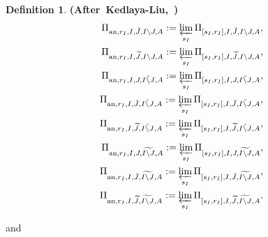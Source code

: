 \documentclass[12pt]{amsart}
\theoremstyle{definition}
\newtheorem{definition}[theorem]{Definition}
\numberwithin{equation}{section}
\begin{document}
\begin{definition} \mbox{\bf{(After Kedlaya-Liu, \cite[Definition 5.2.1]{KL2})}}
\begin{align}
\Pi_{\mathrm{an},r_I,I,\breve{J},I\backslash J,A}:=\varprojlim_{s_I}\Pi_{[s_I,r_I],I,\breve{J},I\backslash J,A},\\	
\Pi_{\mathrm{an},r_I,I,\widetilde{J},I\backslash J,A}:=\varprojlim_{s_I} \Pi_{[s_I,r_I],I,\widetilde{J},I\backslash J,A},\\
\Pi_{\mathrm{an},r_I,I,J,\breve{I\backslash J},A}:=\varprojlim_{s_I}\Pi_{[s_I,r_I],I,J,\breve{I\backslash J},A},\\	
\Pi_{\mathrm{an},r_I,I,\breve{J},\breve{I\backslash J},A}:=\varprojlim_{s_I} \Pi_{[s_I,r_I],I,\breve{J},\breve{I\backslash J},A},\\	
\Pi_{\mathrm{an},r_I,I,\widetilde{J},\breve{I\backslash J},A}:=\varprojlim_{s_I} \Pi_{[s_I,r_I],I,\widetilde{J},\breve{I\backslash J},A},\\
\Pi_{\mathrm{an},r_I,I,J,\widetilde{I\backslash J},A}:=\varprojlim_{s_I} \Pi_{[s_I,r_I],I,J,\widetilde{I\backslash J},A},\\	
\Pi_{\mathrm{an},r_I,I,\breve{J},\widetilde{I\backslash J},A}:=\varprojlim_{s_I} \Pi_{[s_I,r_I],I,\breve{J},\widetilde{I\backslash J},A},\\	
\Pi_{\mathrm{an},r_I,I,\widetilde{J},\widetilde{I\backslash J},A}:=\varprojlim_{s_I} \Pi_{[s_I,r_I],I,\widetilde{J},\widetilde{I\backslash J},A}.	
\end{align}

and 


\end{definition}
\end{document}
